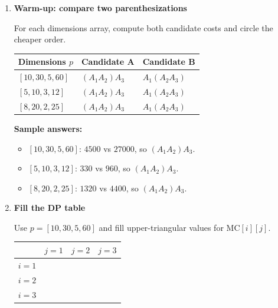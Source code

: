 \documentclass[11pt]{article}
\begin{document}
\begin{enumerate}[leftmargin=0pt, itemindent=1.7em, itemsep=1.2em]

\item \textbf{Warm-up: compare two parenthesizations}

For each dimensions array, compute both candidate costs and circle the cheaper order.

\vspace{0.2cm}
\begin{center}
\renewcommand{\arraystretch}{1.5}
\begin{tabular}{|>{\raggedright\arraybackslash}m{1.8in}|>{\raggedright\arraybackslash}m{2.2in}|>{\raggedright\arraybackslash}m{2.0in}|}
\hline
Dimensions $p$ & Candidate A & Candidate B \\\hline
$[10,30,5,60]$ & $(A_1A_2)A_3$ & $A_1(A_2A_3)$ \\\hline
$[5,10,3,12]$ & $(A_1A_2)A_3$ & $A_1(A_2A_3)$ \\\hline
$[8,20,2,25]$ & $(A_1A_2)A_3$ & $A_1(A_2A_3)$ \\\hline
\end{tabular}
\end{center}

\vspace{0.8cm}

\ifanswers
\textbf{Sample answers:}
\begin{itemize}
    \item $[10,30,5,60]$: $4500$ vs $27000$, so $(A_1A_2)A_3$.
    \item $[5,10,3,12]$: $330$ vs $960$, so $(A_1A_2)A_3$.
    \item $[8,20,2,25]$: $1320$ vs $4400$, so $(A_1A_2)A_3$.
\end{itemize}
\fi

\item \textbf{Fill the DP table}

Use $p=[10,30,5,60]$ and fill upper-triangular values for $\mathrm{MC}[i][j]$.

\vspace{0.2cm}
\begin{center}
\renewcommand{\arraystretch}{1.3}
\begin{tabular}{c|ccc}
  & $j=1$ & $j=2$ & $j=3$ \\\hline
$i=1$ & & & \\
$i=2$ & & & \\
$i=3$ & & & \\
\end{tabular}
\end{center}


\end{enumerate}
\end{document}
